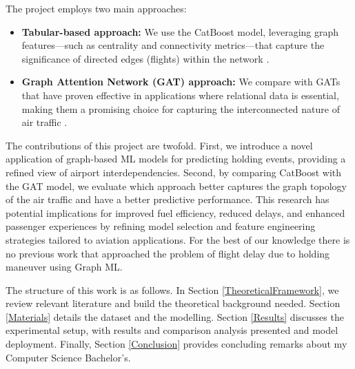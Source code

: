 The project employs two main approaches:

\begin{itemize}
\item \textbf{Tabular-based approach:} We use the CatBoost model,
  leveraging graph features—such as centrality and connectivity
  metrics—that capture the significance of directed edges (flights)
  within the network \cite{prokhorenkova2018catboost}.
\item \textbf{Graph Attention Network (GAT) approach:} We compare
  with GATs that have proven effective in applications where
  relational data is essential, making them a promising choice for
  capturing the interconnected nature of air traffic
  \cite{velickovic2017graph}.
\end{itemize}

The contributions of this project are twofold. First, we introduce a
novel application of graph-based ML models for predicting holding
events, providing a refined view of airport interdependencies. Second,
by comparing CatBoost with the GAT model, we evaluate which approach
better captures the graph topology of the air traffic and have a
better predictive performance. This research has potential
implications for improved fuel efficiency, reduced delays, and
enhanced passenger experiences by refining model selection and feature
engineering strategies tailored to aviation applications. For the best
of our knowledge there is no previous work that approached the problem
of flight delay due to holding maneuver using Graph ML.

The structure of this work is as follows. In Section
\ref{TheoreticalFramework}, we review relevant literature and build
the theoretical background needed. Section \ref{Materials} details the
dataset and the modelling. Section \ref{Results} discusses the
experimental setup, with results and comparison analysis presented and
model deployment. Finally, Section \ref{Conclusion} provides
concluding remarks about my Computer Science Bachelor's.
